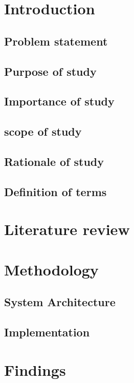 \documentclass[12pt,a4paper,final]{report}
\begin{document}
\renewcommand{\abstractname}{Acknowledgements}
\begin{abstract}

\end{abstract}


\tableofcontents
\newpage
\chapter{Introduction}

\section{Problem statement}
\section{Purpose of study}
\section{Importance of study}
\section{scope of study}
\section{Rationale of study}
\section{Definition of terms}

\chapter{Literature review}

\chapter{Methodology}
\section{System Architecture}
\section{Implementation}
\chapter{Findings}
\end{document}
